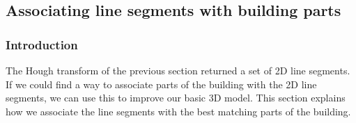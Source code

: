 \documentclass[10pt]{article}
\begin{document}
\subsection{Associating line segments with building parts}
%
% 
% 

	\subsubsection{Introduction}
	The Hough transform of the previous section returned a set of 2D line
	segments.  If we could find a way to associate parts of the building with
	the 2D line segments, we can use this to improve our basic 3D model.
	This section explains how we associate the line segments with the best 
	matching parts of the building. \\
\end{document}
